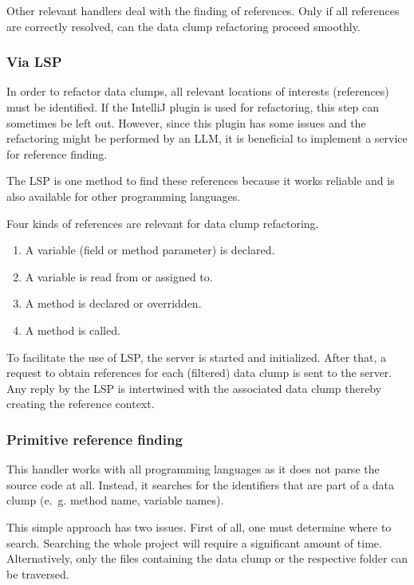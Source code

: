Other relevant handlers deal with the finding of references. Only if all references are correctly resolved, can the data clump refactoring proceed smoothly. 

\subsubsection{Via \ac{LSP}}
In order to refactor data clumps, all relevant locations of interests (references) must be identified. If the IntelliJ plugin is used for refactoring, this step can sometimes be left out. However, since this plugin has some issues and the refactoring might be performed by an \ac{LLM}, it is beneficial to implement a service for reference finding. 

The \ac{LSP} is one method to find these references because it works reliable and is also available for other programming languages.

Four kinds of references are relevant for data clump refactoring.

\begin{enumerate}
     \item A  variable (field or method parameter)  is declared.
    \item A variable is read from or assigned to.
   
    \item A method is declared or overridden.
    \item A method is called.
\end{enumerate}
To facilitate the use of \ac{LSP}, the server is started and initialized. After that, a request to obtain references for each (filtered) data clump is sent to the server.
Any reply by the \ac{LSP} is intertwined with the associated data clump thereby creating the reference context.

 
\subsubsection{Primitive reference finding}
This handler works with all programming languages as it does not parse the source code at all. Instead, it searches for the identifiers that are part of a data clump (e.~g. method name, variable names). 

This simple approach has two issues. First of all, one must determine where to search. Searching the whole project will require a significant amount of time. Alternatively, only the files containing the data clump or the respective folder can be traversed.

